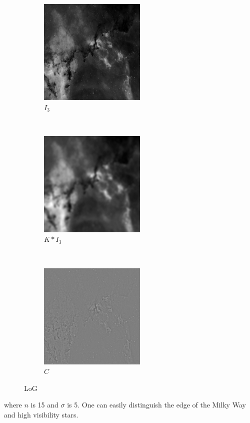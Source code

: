 \documentclass[12pt]{article}
\begin{document}
\begin{figure}[H]
    \centering
    \begin{subfigure}[t]{0.3\textwidth}
        \centering
        \includegraphics[height=2in]{images/crisp_raw}
        \caption{$I_3$}
    \end{subfigure}%
    ~ 
    \begin{subfigure}[t]{0.3\textwidth}
        \centering
        \includegraphics[height=2in]{images/crisp_smooth}
        \caption{$K \ast I_3$}
    \end{subfigure}%
    ~
    \begin{subfigure}[t]{0.3\textwidth}
        \centering
        \includegraphics[height=2in]{images/crisp_crisp}
        \caption{$C$}
    \end{subfigure}
    \caption{LoG}
    \label{fig:crisp_demo}
\end{figure}
where $n$ is 15 and $\sigma$ is 5. One can easily distinguish the edge of the Milky Way and high visibility stars.
\end{document}
